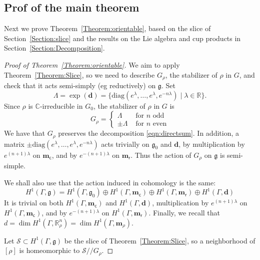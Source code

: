 \documentclass[a4paper,11pt]{article}
\begin{document}
\subsection{Prof of the main theorem}
\label{Section:ProofMT}



Next we prove Theorem~\ref{Theorem:orientable}, based on the slice of Section~\ref{Section:slice} and the results on the Lie algebra and cup products in Section~\ref{Section:Decomposition}.

\begin{proof}[Proof of Theorem~\ref{Theorem:orientable}]

We aim to apply Theorem~\ref{Theorem:Slice}, so we need to describe
$ G_{\rho} $, the stabilizer of $\rho$  in $G$, and check that it acts semi-simply (eg reductively) on $\mathfrak g$.
Set 
$$\Lambda= \exp(\mathbf d)=\{
\mathrm{diag}(e^\lambda,\ldots, e^\lambda, e^{-n\lambda})\mid \lambda\in\mathbb R\}.
$$
Since $\rho$ is $\mathbb C$-irreducible in $G_0$, 
the stabilizer of $\rho$  in $G$ is 
$$
G_{\rho}=
\begin{cases}
 \Lambda & \textrm{ for } n \textrm{ odd}\\
\pm  \Lambda & \textrm{ for } n \textrm{ even}
\end{cases}
$$
We have that $G_\rho$ preserves the decomposition \eqref{eqn:directsum}. In addition,
 a matrix $\pm
\mathrm{diag}(e^\lambda,\ldots, e^\lambda, e^{-n\lambda})
$ acts trivially on  $\mathfrak g_0$ and $\mathbf d$, by multiplication by
 $e^{(n+1)\lambda}$ on $\mathbf m_{\mathsf c}$, and by  $e^{-(n+1)\lambda}$
on $\mathbf m_{\mathsf r}$. Thus the action  of $G_{\rho}$
on $\mathfrak{g}$ is semi-simple.

We shall also use that the action induced in cohomology is the same:
$$
H^1(\Gamma,\mathfrak{g}) = H^1(\Gamma,\mathfrak g_0)\oplus H^1(\Gamma,\mathbf m_{\mathsf c})\oplus H^1(\Gamma,
\mathbf m_{\mathsf r})\oplus H^1(\Gamma,\mathbf d)
$$
It is
trivial on
 both
$ H^1(\Gamma,\mathbf m_{\mathsf c})$ and $ H^1(\Gamma,\mathbf d)$,
multiplication
by $e^{(n+1)\lambda}$ on $H^1(\Gamma,\mathbf m_{\mathsf c})$, and by  $e^{-(n+1)\lambda}$
on $H^1(\Gamma,\mathbf m_{\mathsf r})$.
Finally, we recall that  $d=\dim H^1(\Gamma, \mathbb R^n_\rho)
=\dim H^1(\Gamma, \mathbf m_\rho)$.




Let $\mathcal S\subset H^1(\Gamma,\mathfrak{g})$ be the slice of  Theorem~\ref{Theorem:Slice}, so
 a neighborhood of $[\rho]$ is homeomorphic to 
$
\mathcal S/\!/G_\rho.
$


\end{proof}
\end{document}
